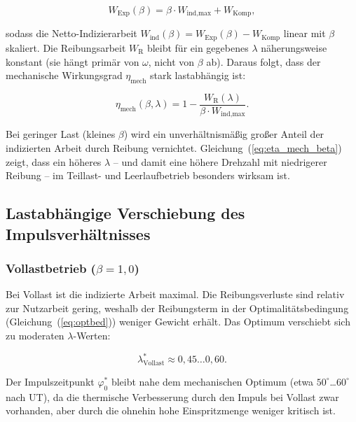 ﻿\documentclass[a4paper,12pt]{article}
\begin{document}
\begin{equation}
  W_\text{Exp}(\beta) = \beta \cdot W_\text{ind,max} + W_\text{Komp},
  \label{eq:wexp_beta}
\end{equation}

\noindent
sodass die Netto-Indizierarbeit $W_\text{ind}(\beta) = W_\text{Exp}(\beta) -
W_\text{Komp}$ linear mit $\beta$ skaliert. Die Reibungsarbeit $W_\text{R}$
bleibt für ein gegebenes $\lambda$ näherungsweise konstant (sie hängt primär
von $\omega$, nicht von $\beta$ ab). Daraus folgt, dass der mechanische
Wirkungsgrad $\eta_\text{mech}$ stark lastabhängig ist:

\begin{equation}
  \eta_\text{mech}(\beta, \lambda) =
    1 - \frac{W_\text{R}(\lambda)}{\beta \cdot W_\text{ind,max}}.
  \label{eq:eta_mech_beta}
\end{equation}

Bei geringer Last (kleines $\beta$) wird ein unverhältnismäßig großer Anteil
der indizierten Arbeit durch Reibung vernichtet. Gleichung~(\ref{eq:eta_mech_beta})
zeigt, dass ein höheres $\lambda$ -- und damit eine höhere Drehzahl mit niedrigerer
Reibung -- im Teillast- und Leerlaufbetrieb besonders wirksam ist.

\subsection{Lastabhängige Verschiebung des Impulsverhältnisses}

\subsubsection*{Vollastbetrieb ($\beta = 1{,}0$)}

Bei Vollast ist die indizierte Arbeit maximal. Die Reibungsverluste sind relativ
zur Nutzarbeit gering, weshalb der Reibungsterm in der Optimalitätsbedingung
(Gleichung~(\ref{eq:optbed})) weniger Gewicht erhält. Das Optimum verschiebt
sich zu moderaten $\lambda$-Werten:

\begin{equation}
  \lambda^*_\text{Vollast} \approx 0{,}45 \ldots 0{,}60.
  \label{eq:lambda_vollast}
\end{equation}

Der Impulszeitpunkt $\varphi_0^*$ bleibt nahe dem mechanischen Optimum
(etwa $50^\circ$\ldots$60^\circ$ nach UT), da die thermische Verbesserung durch den
Impuls bei Vollast zwar vorhanden, aber durch die ohnehin hohe Einspritzmenge
weniger kritisch ist.
\end{document}

